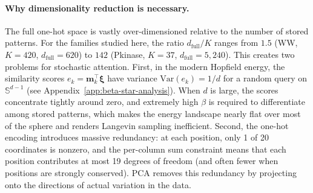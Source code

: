 \paragraph{Why dimensionality reduction is necessary.}
The full one-hot space is vastly over-dimensioned relative to the number of stored patterns. For the families studied here, the ratio $d_{\mathrm{full}}/K$ ranges from $1.5$ (WW, $K{=}420$, $d_{\mathrm{full}}{=}620$) to $142$ (Pkinase, $K{=}37$, $d_{\mathrm{full}}{=}5{,}240$). This creates two problems for stochastic attention. First, in the modern Hopfield energy, the similarity scores $e_k = \mathbf{m}_k^\top\boldsymbol{\xi}$ have variance $\mathrm{Var}(e_k) = 1/d$ for a random query on $\mathbb{S}^{d-1}$ (see Appendix~\ref{app:beta-star-analysis}). When $d$ is large, the scores concentrate tightly around zero, and extremely high $\beta$ is required to differentiate among stored patterns, which makes the energy landscape nearly flat over most of the sphere and renders Langevin sampling inefficient. Second, the one-hot encoding introduces massive redundancy: at each position, only 1 of 20 coordinates is nonzero, and the per-column sum constraint means that each position contributes at most 19 degrees of freedom (and often fewer when positions are strongly conserved). PCA removes this redundancy by projecting onto the directions of actual variation in the data.

